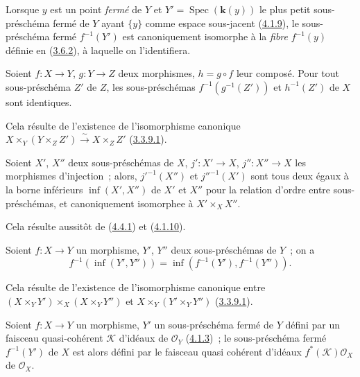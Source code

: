 Lorsque $y$ est un point \emph{fermé} de $Y$ et
$Y'=\operatorname{Spec}(\boldsymbol{k}(y))$ le plus petit sous-préschéma fermé de $Y$ ayant
$\{y\}$ comme espace sous-jacent (\hyperref[I.4.1.9-fr]{4.1.9}), le
sous-préschéma fermé $f^{-1}(Y')$ est canoniquement isomorphe à la
\emph{fibre} $f^{-1}(y)$ définie en (\hyperref[I.3.6.2-fr]{3.6.2}), à
laquelle on l'identifiera.

\begin{corollary}[4.4.2]
\label{I.4.4.2-fr}
Soient $f:X\to Y$, $g:Y\to Z$ deux morphismes, $h=g\circ f$ leur composé.
Pour tout sous-préschéma $Z'$ de $Z$, les sous-préschémas
$f^{-1}(g^{-1}(Z'))$ et $h^{-1}(Z')$ de $X$ sont identiques.
\end{corollary}

Cela résulte de l'existence de l'isomorphisme canonique
$X\times_Y(Y\times_Z Z')\xrightarrow{\sim}X\times_Z Z'$
(\hyperref[I.3.3.9.1-fr]{3.3.9.1}).

\begin{corollary}[4.4.3]
\label{I.4.4.3-fr}
Soient $X'$, $X''$ deux sous-préschémas de $X$, $j':X'\to X$,
$j'':X''\to X$ les morphismes d'injection~; alors, ${j'}^{-1}(X'')$ et
${j''}^{-1}(X')$ sont tous deux égaux à la borne inférieurs
$\inf(X',X'')$ de $X'$ et $X''$ pour la relation d'ordre entre
sous-préschémas, et canoniquement isomorphee à $X'\times_X X''$.
\end{corollary}

Cela résulte aussitôt de (\hyperref[I.4.4.1-fr]{4.4.1}) et
(\hyperref[I.4.1.10-fr]{4.1.10}).

\begin{corollary}[4.4.4]
\label{I.4.4.4-fr}
Soient $f:X\to Y$ un morphisme, $Y'$, $Y''$ deux sous-préschémas de $Y$~;
on a
\[
  f^{-1}(\inf(Y',Y''))=\inf(f^{-1}(Y'),f^{-1}(Y'')).
\]
\end{corollary}

Cela résulte de l'existence de l'isomorphisme canonique entre
$(X\times_Y Y')\times_X(X\times_Y Y'')$ et
$X\times_Y(Y'\times_Y Y'')$ (\hyperref[I.3.3.9.1-fr]{3.3.9.1}).

\begin{proposition}[4.4.5]
\label{I.4.4.5-fr}
Soient $f:X\to Y$ un morphisme, $Y'$ un sous-préschéma fermé de $Y$ défini
par un faisceau quasi-cohérent $\mathscr{K}$ d'idéaux de $\mathscr{O}_Y$
(\hyperref[I.4.1.3-fr]{4.1.3})~; le sous-préschéma fermé $f^{-1}(Y')$ de $X$
est alors défini par le faisceau quasi cohérent d'idéaux
$f^*(\mathscr{K})\mathscr{O}_X$ de $\mathscr{O}_X$.
\end{proposition}

